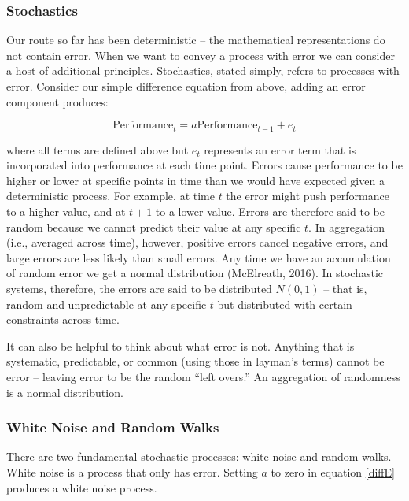 \documentclass[english,,man]{apa6}
\theoremstyle{definition}
\theoremstyle{definition}
\theoremstyle{definition}
\theoremstyle{remark}
\begin{document}
\hypertarget{stochastics}{%
\subsubsection{Stochastics}\label{stochastics}}

Our route so far has been deterministic -- the mathematical
representations do not contain error. When we want to convey a process
with error we can consider a host of additional principles. Stochastics,
stated simply, refers to processes with error. Consider our simple
difference equation from above, adding an error component produces:

\begin{equation}
\label{diffE}
\textrm{Performance}_{t} = a \textrm{Performance}_{t-1} + e_{t}
\end{equation}

\noindent where all terms are defined above but \(e_{t}\) represents an
error term that is incorporated into performance at each time point.
Errors cause performance to be higher or lower at specific points in
time than we would have expected given a deterministic process. For
example, at time \(t\) the error might push performance to a higher
value, and at \(t+1\) to a lower value. Errors are therefore said to be
random because we cannot predict their value at any specific \(t\). In
aggregation (i.e., averaged across time), however, positive errors
cancel negative errors, and large errors are less likely than small
errors. Any time we have an accumulation of random error we get a normal
distribution (McElreath, 2016). In stochastic systems, therefore, the
errors are said to be distributed \(N(0, 1)\) -- that is, random and
unpredictable at any specific \(t\) but distributed with certain
constraints across time.

It can also be helpful to think about what error is not. Anything that
is systematic, predictable, or common (using those in layman's terms)
cannot be error -- leaving error to be the random \enquote{left overs.}
An aggregation of randomness is a normal distribution.

\hypertarget{white-noise-and-random-walks}{%
\subsubsection{White Noise and Random
Walks}\label{white-noise-and-random-walks}}

There are two fundamental stochastic processes: white noise and random
walks. White noise is a process that only has error. Setting \(a\) to
zero in equation \ref{diffE} produces a white noise process.
\end{document}
